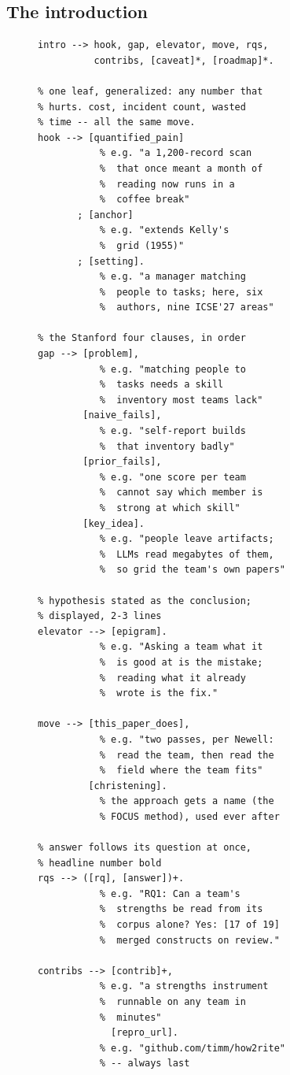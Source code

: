 \subsection{The introduction}

\begin{figure}[p]
\begin{minipage}[t]{0.34\textwidth}
\begin{lstlisting}[style=dcg]
intro --> hook, gap, elevator, move, rqs,
          contribs, [caveat]*, [roadmap]*.

% one leaf, generalized: any number that
% hurts. cost, incident count, wasted
% time -- all the same move.
hook --> [quantified_pain]
           % e.g. "a 1,200-record scan
           %  that once meant a month of
           %  reading now runs in a
           %  coffee break"
       ; [anchor]
           % e.g. "extends Kelly's
           %  grid (1955)"
       ; [setting].
           % e.g. "a manager matching
           %  people to tasks; here, six
           %  authors, nine ICSE'27 areas"

% the Stanford four clauses, in order
gap --> [problem],
           % e.g. "matching people to
           %  tasks needs a skill
           %  inventory most teams lack"
        [naive_fails],
           % e.g. "self-report builds
           %  that inventory badly"
        [prior_fails],
           % e.g. "one score per team
           %  cannot say which member is
           %  strong at which skill"
        [key_idea].
           % e.g. "people leave artifacts;
           %  LLMs read megabytes of them,
           %  so grid the team's own papers"

% hypothesis stated as the conclusion;
% displayed, 2-3 lines
elevator --> [epigram].
           % e.g. "Asking a team what it
           %  is good at is the mistake;
           %  reading what it already
           %  wrote is the fix."

move --> [this_paper_does],
           % e.g. "two passes, per Newell:
           %  read the team, then read the
           %  field where the team fits"
         [christening].
           % the approach gets a name (the
           % FOCUS method), used ever after

% answer follows its question at once,
% headline number bold
rqs --> ([rq], [answer])+.
           % e.g. "RQ1: Can a team's
           %  strengths be read from its
           %  corpus alone? Yes: [17 of 19]
           %  merged constructs on review."

contribs --> [contrib]+,
           % e.g. "a strengths instrument
           %  runnable on any team in
           %  minutes"
             [repro_url].
           % e.g. "github.com/timm/how2rite"
           % -- always last


\end{lstlisting}
\end{minipage}
\end{figure}
